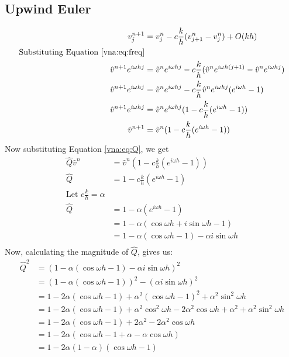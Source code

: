 \subsection{Upwind Euler}
\begin{equation*}
\begin{align}
    v_j^{n+1}	&= v_j^n - c\frac{k}{h}(v_{j+1}^n - v_j^n) + O(kh)					\\
    \text{Substituting Equation \ref{vna:eq:freq}} 							\\
    \hat{v}^{n+1}e^{i\omega hj} &= \hat{v}^ne^{i\omega hj} - c\frac{k}{h} (\hat{v}^ne^{i\omega h(j+1)} - \hat{v}^ne^{i\omega hj})									    \\
    \hat{v}^{n+1}e^{i\omega hj} &= \hat{v}^ne^{i\omega hj} - c\frac{k}{h} \hat{v}^ne^{i\omega hj} (e^{i\omega h} - 1)												    \\
    \hat{v}^{n+1}e^{i\omega hj} &= \hat{v}^ne^{i\omega hj}(1 - c\frac{k}{h} (e^{i\omega h} - 1))	\\
    \hat{v}^{n+1} &= \hat{v}^n(1 - c\frac{k}{h} (e^{i\omega h} - 1))					\\
\end{align}
\end{equation*}
Now substituting Equation \ref{vna:eq:Q}, we get
\begin{equation*}
\begin{align}
    \hat{Q}\hat{v}^n &= \hat{v}^n(1 - c\frac{k}{h} (e^{i\omega h} - 1))	\\
    \hat{Q} &= 1 - c\frac{k}{h} (e^{i\omega h} - 1)			\\
    \text{Let } c\frac{k}{h} = \alpha 					\\
    \hat{Q} &= 1 - \alpha (e^{i\omega h} - 1)				\\
	    &= 1 - \alpha (\cos \omega h 	+ i \sin \omega h - 1)	\\
	    &= 1 - \alpha (\cos \omega h - 1) 	- \alpha i \sin \omega h\\
\end{align}
\end{equation*}
Now, calculating the magnitude of $\hat{Q}$, gives us:
\begin{equation*}
\begin{align}
    \hat{Q}^2 &= (1 - \alpha (\cos \omega h  - 1)	- \alpha i \sin \omega h )^2									\\
	      &= (1 - \alpha (\cos \omega h  - 1))^2 	- (\alpha i \sin \omega h )^2									\\
	      &= 1  - 2\alpha (\cos \omega h  - 1) 	+ \alpha^2(\cos \omega h  -1)^2	+ \alpha^2 \sin^2 \omega h					\\
	      &= 1  - 2\alpha (\cos \omega h  - 1) 	+ \alpha^2 \cos^2 \omega h - 2\alpha^2 \cos \omega h	+ \alpha^2 + \alpha^2 \sin^2 \omega h	\\
	      &= 1  - 2\alpha (\cos \omega h  - 1) 	+ 2\alpha^2 - 2\alpha^2 \cos \omega h								\\
	      &= 1  - 2\alpha (\cos \omega h  - 1 + \alpha - \alpha \cos \omega h)									\\
	      &= 1  - 2\alpha(1 - \alpha) (\cos \omega h  - 1)												\\
\end{align}
\end{equation*}
